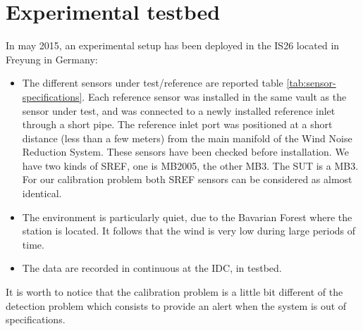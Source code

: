  \newpage\clearpage
\section{Experimental testbed}
In may 2015, an experimental setup has been deployed in the IS26 located in Freyung in Germany:
\begin{itemize}
\item
The different sensors under test/reference are reported table \ref{tab:sensor-specifications}. Each reference sensor was installed in the same vault as the sensor under test, and was connected to a newly installed reference inlet through a short pipe. The reference inlet port was positioned at a short distance (less than a few meters) from the main manifold of the Wind Noise Reduction System. 
These sensors have been checked before installation. We have two kinds of SREF, one is MB2005, the other MB3. The SUT is a MB3. For our calibration problem both SREF sensors can be considered as almost identical.
\item
The environment is particularly  quiet, due to the Bavarian Forest where the station is located. It follows that the wind is very low during large periods of time.

 \item
The data are recorded in continuous at the IDC, in testbed.
\end{itemize}

It is worth to notice that the calibration problem is a little bit different of the detection problem which consists to provide an alert when the system is out of specifications.


